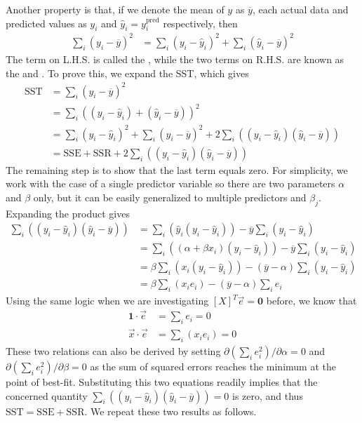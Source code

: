 Another property is that, if we denote the mean of $y$ as $\overline{y}$, each actual data and predicted values as $y_i$ and $\hat{y}_i = y^{\text{pred}}_i$ respectively, then
\begin{align*}
\sum_i (y_i - \overline{y})^2 &= \sum_i (y_i - \hat{y}_i)^2 + \sum_i (\hat{y}_i - \overline{y})^2
\end{align*}
The term on L.H.S. is called the , while the two terms on R.H.S. are known as the  and . To prove this, we expand the SST, which gives
\begin{align*}
\text{SST} &= \sum_i (y_i - \overline{y})^2 \\
&= \sum_i ((y_i - \hat{y}_i) + (\hat{y}_i - \overline{y}))^2 \\
&= \sum_i (y_i - \hat{y}_i)^2 + \sum_i (\hat{y}_i - \overline{y})^2 + 2\sum_i ((y_i - \hat{y}_i) (\hat{y}_i - \overline{y})) \\
&= \text{SSE} + \text{SSR} + 2\sum_i ((y_i - \hat{y}_i) (\hat{y}_i - \overline{y}))
\end{align*}
The remaining step is to show that the last term equals zero. For simplicity, we work with the case of a single predictor variable so there are two parameters $\alpha$ and $\beta$ only, but it can be easily generalized to multiple predictors and $\beta_j$. Expanding the product gives
\begin{align*}
\sum_i ((y_i - \hat{y}_i) (\hat{y}_i - \overline{y})) &= \sum_i (\hat{y}_i(y_i - \hat{y}_i)) - \overline{y} \sum_i (y_i - \hat{y}_i) \\
&= \sum_i ((\alpha + \beta x_i)(y_i - \hat{y}_i)) - \overline{y} \sum_i (y_i - \hat{y}_i) \\
&= \beta \sum_i (x_i(y_i - \hat{y}_i)) - (\overline{y} - \alpha) \sum_i (y_i - \hat{y}_i) \\
&= \beta \sum_i (x_i e_i) - (\overline{y} - \alpha) \sum_i e_i
\end{align*}
Using the same logic when we are investigating $[X]^T\vec{e} = \textbf{0}$ before, we know that
\begin{align*}
\textbf{1} \cdot \vec{e} &= \sum_i e_i = 0 \\
\vec{x} \cdot \vec{e} &= \sum_i (x_i e_i) = 0
\end{align*}
These two relations can also be derived by setting $\partial (\sum_i e_i^2)/\partial \alpha = 0$ and $\partial (\sum_i e_i^2)/\partial \beta = 0$ as the sum of squared errors reaches the minimum at the point of best-fit. Substituting this two equations readily implies that the concerned quantity $\sum_i ((y_i - \hat{y}_i) (\hat{y}_i - \overline{y})) = 0$ is zero, and thus $\text{SST} = \text{SSE} + \text{SSR}$. We repeat these two results as follows.
